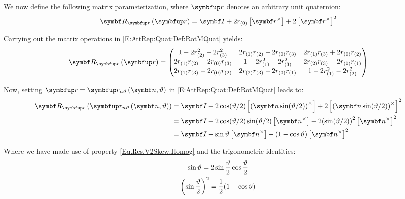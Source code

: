 We now define the following matrix parameterization, where $\quat{\unitq}$ denotes an arbitrary unit quaternion:
\begin{equation} \label{E:AttRep:Quat:Def:RotMQuat}
\RotMQuat{\quat{\unitq}} = \IdM + 2 \qreal{\unitq} \vskew{\qvec{\unitq}} + 2\vskew{\qvec{\unitq}}^2
\end{equation}

Carrying out the matrix operations in \eqref{E:AttRep:Quat:Def:RotMQuat} yields:
\begin{equation}\label{E:AttRep:Quat:Res:RotMQuatExp}
\RotMQuat{\quat{\rotq}} = \matenv
{
1 - 2\qcmp{\rotq}{2}^{2} - 2\qcmp{\rotq}{3}^{2}						&2\qcmp{\rotq}{1}\qcmp{\rotq}{2}-2\qcmp{\rotq}{0}\qcmp{\rotq}{3}	&2\qcmp{\rotq}{1}\qcmp{\rotq}{3}+2\qcmp{\rotq}{0}\qcmp{\rotq}{2}\\
2\qcmp{\rotq}{1}\qcmp{\rotq}{2}+2\qcmp{\rotq}{0}\qcmp{\rotq}{3}		&1 - 2\qcmp{\rotq}{1}^{2} - 2\qcmp{\rotq}{3}^{2}						&2\qcmp{\rotq}{2}\qcmp{\rotq}{3}-2\qcmp{\rotq}{0}\qcmp{\rotq}{1}\\
2\qcmp{\rotq}{1}\qcmp{\rotq}{3}-2\qcmp{\rotq}{0}\qcmp{\rotq}{2}		&2\qcmp{\rotq}{2}\qcmp{\rotq}{3}+2\qcmp{\rotq}{0}\qcmp{\rotq}{1}	&1 - 2\qcmp{\rotq}{1}^{2} - 2\qcmp{\rotq}{2}^{2}
}
\end{equation}

Now, setting $\quat{\unitq}=\RotQAxAng{\mcol{\rotax}}{\rotang}$ in \eqref{E:AttRep:Quat:Def:RotMQuat} leads to:
\begin{equation} \label{E:AttRep:Quat:Der:RotMRotQAxAng}
\begin{split}
\RotMQuat{\RotQAxAng{\mcol{\rotax}}{\rotang}} &= \IdM + 2 \cos (\rotang/2) \vskew{(\mcol{\rotax} \sin (\rotang/2))} + 2\vskew{(\mcol{\rotax} \sin (\rotang/2))}^2\\
&= \IdM + 2 \cos (\rotang/2) \sin (\rotang/2) \vskew{\mcol{\rotax}} + 2 {\left(\sin (\rotang/2)\right)}^2 \vskew{\mcol{\rotax}}^2\\
&= \IdM + \sin \rotang \vskew{\mcol{\rotax}} +  (1-\cos \rotang) \vskew{\mcol{\rotax}}^2
\end{split}
\end{equation}

Where we have made use of property \eqref{Eq.Res.V2Skew.Homog} and the trigonometric identities:
\begin{gather*}
\sin \vartheta = 2 \sin \frac{\vartheta}{2} \cos \frac{\vartheta}{2} \\
{\left(\sin \frac{\vartheta}{2}\right)}^2 = \frac{1}{2} (1 - \cos \vartheta)
\end{gather*}

